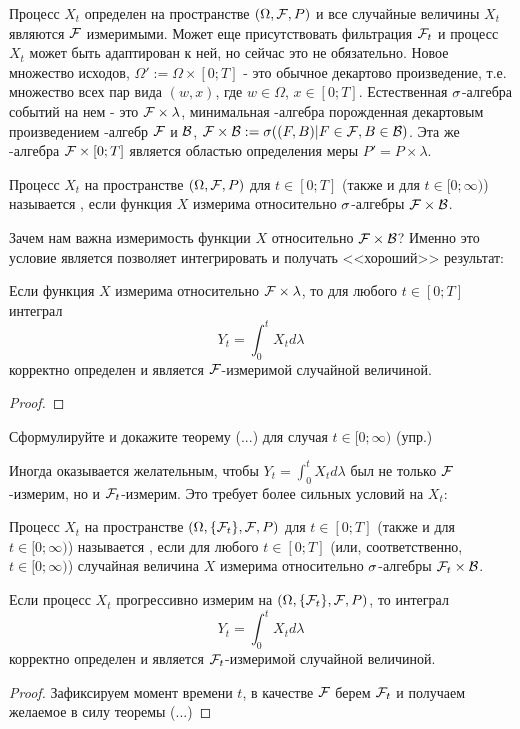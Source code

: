 {Процесс $X_{t}$ определен на пространстве $(\Omega,\mathcal{F},P)$ и все случайные величины $X_{t}$ являются $\mathcal{F}$ измеримыми.  Может еще присутствовать фильтрация $\mathcal{F}_{t}$ и процесс $X_{t}$ может быть адаптирован к ней, но сейчас это не обязательно. Новое множество исходов, $\Omega':=\Omega\times [0;T]$ - это обычное декартово произведение, т.е. множество всех пар вида $(w,x)$, где $w\in\Omega$, $x\in [0;T]$. Естественная $\sigma$-алгебра событий на нем - это $\mathcal{F}\times\lambda$, минимальная \s-алгебра порожденная декартовым произведением \s-алгебр $\mathcal{F}$ и $\mathcal{B}$, $\mathcal{F}\times\mathcal{B}:=\sigma((F,B)|F\in\mathcal{F},B\in\mathcal{B})$. Эта же \s-алгебра $\mathcal{F}\times [0;T]$ является областью определения меры $P'=P\times\lambda$.

\begin{mydef} Процесс $X_{t}$ на пространстве $(\Omega,\mathcal{F},P)$ для $t\in[0;T]$ (также и для $t\in[0;\infty)$) называется , если функция $X$ измерима относительно $\sigma$-алгебры $\mathcal{F}\times \mathcal{B}$.
\end{mydef}

Зачем нам важна измеримость функции $X$ относительно $\mathcal{F}\times\mathcal{B}$? Именно это условие является позволяет интегрировать и получать <<хороший>> результат:

\begin{myth} Если функция $X$ измерима относительно $\mathcal{F}\times\lambda$, то для любого $t\in [0;T]$ интеграл $$Y_{t}=\int_{0}^{t}X_{t}d\lambda$$ корректно определен и является $\mathcal{F}$-измеримой случайной величиной.
\end{myth}
\begin{proof}
\end{proof}

Сформулируйте и докажите теорему (...) для случая $t\in[0;\infty)$ (упр.)

Иногда оказывается желательным, чтобы $Y_{t}=\int_{0}^{t}X_{t}d\lambda$ был не только $\mathcal{F}$-измерим, но и $\mathcal{F}_{t}$-измерим. Это требует более сильных условий на $X_{t}$:

\begin{mydef} Процесс $X_{t}$ на пространстве $(\Omega,\{\mathcal{F}_{t}\},\mathcal{F},P)$ для $t\in[0;T]$ (также и для $t\in[0;\infty)$) называется , если для любого $t\in[0;T]$ (или, соответственно, $t\in[0;\infty)$) случайная величина $X$ измерима относительно $\sigma$-алгебры $\mathcal{F}_{t}\times \mathcal{B}$.
\end{mydef}
\begin{myth} Если процесс $X_{t}$ прогрессивно измерим на $(\Omega,\{\mathcal{F}_{t}\},\mathcal{F},P)$, то интеграл $$Y_{t}=\int_{0}^{t}X_{t}d\lambda$$ корректно определен и является $\mathcal{F}_{t}$-измеримой случайной величиной.
\end{myth}
\begin{proof} Зафиксируем момент времени $t$, в качестве $\mathcal{F}$ берем $\mathcal{F}_{t}$ и получаем желаемое в силу теоремы (...)
\end{proof}

}
